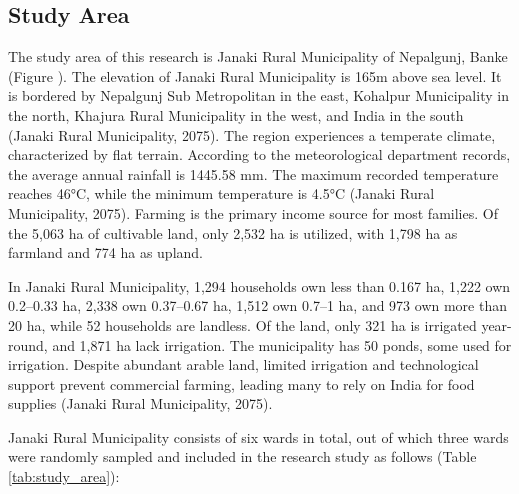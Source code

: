 \subsection{Study Area}



The study area of this research is Janaki Rural Municipality of Nepalgunj, Banke (Figure ). The elevation of Janaki Rural Municipality is 165m above sea level. It is bordered by Nepalgunj Sub Metropolitan in the east, Kohalpur Municipality in the north, Khajura Rural Municipality in the west, and India in the south (Janaki Rural Municipality, 2075). The region experiences a temperate climate, characterized by flat terrain. According to the meteorological department records, the average annual rainfall is 1445.58 mm. The maximum recorded temperature reaches 46°C, while the minimum temperature is 4.5°C (Janaki Rural Municipality, 2075). Farming is the primary income source for most families. Of the 5,063 ha of cultivable land, only 2,532 ha is utilized, with 1,798 ha as farmland and 774 ha as upland.

In Janaki Rural Municipality, 1,294 households own less than 0.167 ha, 1,222 own 0.2–0.33 ha, 2,338 own 0.37–0.67 ha, 1,512 own 0.7–1 ha, and 973 own more than 20 ha, while 52 households are landless. Of the land, only 321 ha is irrigated year-round, and 1,871 ha lack irrigation. The municipality has 50 ponds, some used for irrigation. Despite abundant arable land, limited irrigation and technological support prevent commercial farming, leading many to rely on India for food supplies (Janaki Rural Municipality, 2075).

Janaki Rural Municipality consists of six wards in total, out of which three wards were randomly sampled and included in the research study as follows (Table \ref{tab:study_area}): 

\begin{table}[h]
\centering
\caption{Study Area with elevation and coordinates}
\label{tab:study_area}
\end{table}

